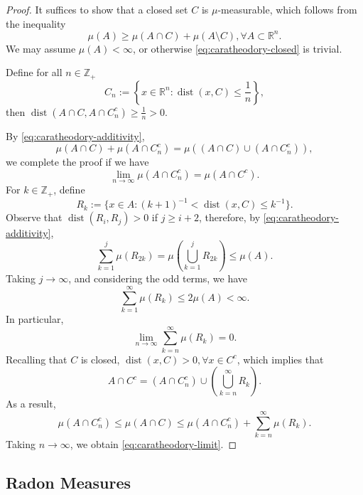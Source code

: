     \begin{proof}
        It suffices to show that a closed set $C$ is $\mu$-measurable, which follows from the inequality
        \begin{equation}
            \mu(A)\geq \mu(A\cap C)+\mu(A\setminus C), \forall A \subset \mathbb{R}^{n}.
            \label{eq:caratheodory-closed}
        \end{equation}
        We may assume $\mu(A)< \infty$, or otherwise \eqref{eq:caratheodory-closed} is trivial.

        Define for all $n \in \mathbb{Z}_{+}$ 
        \[
            C_{n}:=\left\{  x \in \mathbb{R}^{n}:\operatorname{dist}(x,C)\leq \frac{1}{n}  \right\},
        \]
        then $\operatorname{dist}(A\cap C, A\cap C_{n}^{c})\geq \frac{1}{n}>0$.

        By \eqref{eq:caratheodory-additivity},
        \[
            \mu(A\cap C)+\mu(A\cap C^{c}_{n})= \mu((A\cap C)\cup (A\cap C_{n}^{c})),
        \]
        we complete the proof if we have
        \begin{equation}
            \lim_{ n \to \infty } \mu(A\cap C_{n}^{c})=\mu(A\cap C^{c}).
            \label{eq:caratheodory-limit}
        \end{equation}
        For $k\in \mathbb{Z}_{+}$, define
        \[
            R_{k}:=\{ x \in A:(k+1)^{-1}<\operatorname{dist}(x,C)\leq k^{-1} \}.
        \]
        Observe that $\operatorname{dist}(R_{i},R_{j})>0$ if $j\geq i+2$, therefore, by \eqref{eq:caratheodory-additivity},
        \[
            \sum _{k=1}^{j}\mu(R_{2k}) = \mu(\bigcup _{k=1}^{j}R_{2k})\leq \mu(A).
        \]
        Taking $j\to \infty$, and considering the odd terms, we have
        \[
            \sum _{k=1}^{\infty}\mu(R_{k})\leq 2\mu(A)<\infty.
        \]
        In particular,
        \[
            \lim_{ n \to \infty } \sum _{k=n}^{\infty}\mu(R_{k})=0.
        \]
        Recalling that $C$ is closed, $\operatorname{dist}(x,C)>0,\forall x \in C^{c}$, which implies that
        \[
            A\cap C^{c} = (A\cap C_{n}^{c})\cup \left( \bigcup _{k=n}^{\infty} R_{k} \right).
        \]
        As a result,
        \[
            \mu(A\cap C_{n}^{c})\leq \mu(A\cap C)\leq \mu(A\cap C_{n}^{c})+\sum _{k=n}^{\infty} \mu(R_{k}).
        \]
        Taking $n\to \infty$, we obtain \eqref{eq:caratheodory-limit}.
    \end{proof}

    \subsection{Radon Measures}

